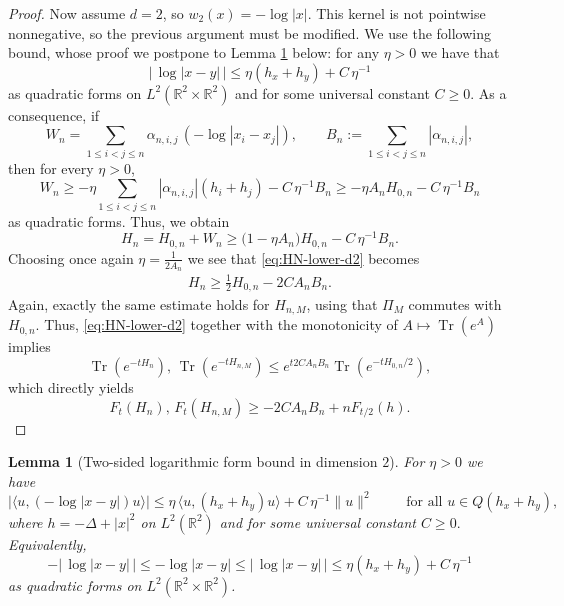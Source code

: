 \documentclass[11pt]{amsart}
\newcommand{\1}{\mathbbm{1}}
\newcommand{\Tr}{\operatorname{Tr}}
\newcommand{\R}{\mathbb{R}}
\theoremstyle{plain}
\newtheorem{lemma}[theorem]{Lemma}
\theoremstyle{definition}
\theoremstyle{remark}
\numberwithin{equation}{section}
\begin{document}
\begin{proof}
\noindent
Now assume \(d=2\), so
$w_2(x)=-\log|x|$. This kernel is not pointwise nonnegative, so the previous argument must be modified. We use the following bound, whose proof we postpone to Lemma \ref{lem:two-sided-log-form-bound} below: for any $\eta>0$ we have that 
\begin{equation}
|\,\log|x-y|\,|
\le
\eta(h_x+h_y)+C \,\eta^{-1}
\end{equation}
as quadratic forms on \(L^2(\R^2\times\R^2)\) and for some universal constant $C\ge 0.$
\noindent As a consequence, if
\[
W_n=\sum_{1\le i<j\le n}\alpha_{n,i,j}\,(-\log|x_i-x_j|),
\qquad
B_n:=\sum_{1\le i<j\le n}|\alpha_{n,i,j}|,
\]
then for every \(\eta>0\),
\begin{equation}
\label{eq:signed-log-lower-bound}
W_n
\ge
-\eta\sum_{1\le i<j\le n}|\alpha_{n,i,j}|(h_i+h_j)-C \,\eta^{-1} B_n\ge -\eta A_n H_{0,n}-C \,\eta^{-1}B_n
\end{equation}
as quadratic forms. Thus, we obtain
\begin{equation}
\label{eq:HN-lower-d2}
H_n=H_{0,n}+W_n \ge
\big(1-\eta A_n\big)H_{0,n}-C \,\eta^{-1} B_n.
\end{equation}
Choosing once again $\eta = \frac{1}{2A_n}$ we see that \eqref{eq:HN-lower-d2} becomes
\begin{align}\label{fordequals2222}
H_n\ge  \frac{1}{2}H_{0,n}- 2C A_nB_n.
\end{align}
Again, exactly the same estimate holds for \(H_{n,M}\), using that \(\Pi_M\) commutes with \(H_{0,n}\). Thus, \eqref{eq:HN-lower-d2} together with the monotonicity of $A\mapsto \Tr(e^A)$ implies
\[
\Tr(e^{-tH_n}),\,\Tr(e^{-tH_{n,M}})\le e^{t 2C A_nB_n}\Tr(e^{-t H_{0,n}/2}),
\]
which directly yields
\begin{equation}
\label{eq:ZN-upper-d2-detailed}
F_t(H_n),\,F_t(H_{n,M})\ge -2CA_n B_n    + nF_{t/2}(h).
\end{equation}

\end{proof}








\begin{lemma}[Two-sided logarithmic form bound in dimension \(2\)]
\label{lem:two-sided-log-form-bound}
For \(\eta>0\) we have 
\begin{equation}
\label{eq:two-sided-log-form-bound}
\bigl|\langle u,(-\log|x-y|)u\rangle\bigr|
\le
\eta\,\langle u,(h_x+h_y)u\rangle + C \,\eta^{-1}\|u\|^2
\qquad\text{ for all }u\in Q(h_x+h_y),
\end{equation}
where \(h=-\Delta+|x|^2\) on \(L^2(\R^2)\) and for some universal constant $C\ge 0.$  Equivalently,
\begin{equation}
\label{eq:two-sided-log-operator-bound}
-|\,\log|x-y|\,|
\le
-\log|x-y|
\le
|\,\log|x-y|\,|
\le
\eta(h_x+h_y)+C \,\eta^{-1}
\end{equation}
as quadratic forms on \(L^2(\R^2\times\R^2)\).
\end{lemma}
\end{document}

